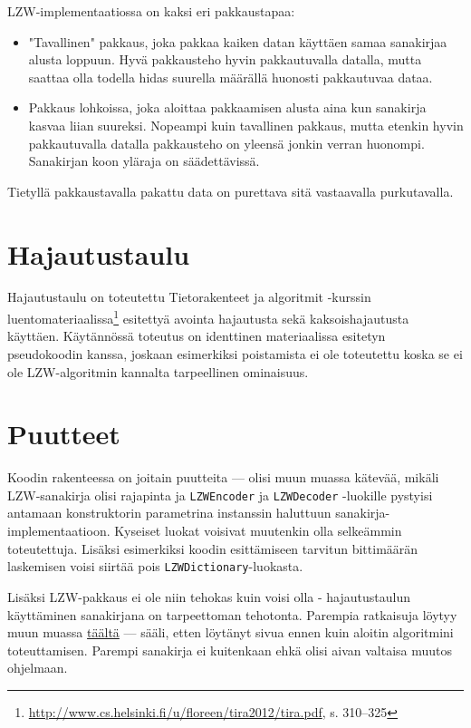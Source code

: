 \documentclass{article}
\begin{document}
LZW-implementaatiossa on kaksi eri pakkaustapaa:
\begin{itemize}
	\item "Tavallinen" pakkaus, joka pakkaa kaiken datan käyttäen samaa sanakirjaa alusta loppuun. Hyvä pakkausteho hyvin pakkautuvalla datalla, mutta saattaa olla todella hidas suurella määrällä huonosti pakkautuvaa dataa.
	\item Pakkaus lohkoissa, joka aloittaa pakkaamisen alusta aina kun sanakirja kasvaa liian suureksi. Nopeampi kuin tavallinen pakkaus, mutta etenkin hyvin pakkautuvalla datalla pakkausteho on yleensä jonkin verran huonompi. Sanakirjan koon yläraja on säädettävissä.
\end{itemize}
Tietyllä pakkaustavalla pakattu data on purettava sitä vastaavalla purkutavalla.

\section {Hajautustaulu}

Hajautustaulu on toteutettu Tietorakenteet ja algoritmit -kurssin luentomateriaalissa\footnote{\url{http://www.cs.helsinki.fi/u/floreen/tira2012/tira.pdf}, s. 310--325} esitettyä avointa hajautusta sekä kaksoishajautusta käyttäen. Käytännössä toteutus on identtinen materiaalissa esitetyn pseudokoodin kanssa, joskaan esimerkiksi poistamista ei ole toteutettu koska se ei ole LZW-algoritmin kannalta tarpeellinen ominaisuus.

\section {Puutteet}

Koodin rakenteessa on joitain puutteita --- olisi muun muassa kätevää, mikäli LZW-sanakirja olisi rajapinta ja \verb+LZWEncoder+ ja \verb+LZWDecoder+ -luokille pystyisi antamaan konstruktorin parametrina instanssin haluttuun sanakirja-\-implementaatioon. Kyseiset luokat voisivat muutenkin olla selkeämmin toteutettuja. Lisäksi esimerkiksi koodin esittämiseen tarvitun bittimäärän laskemisen voisi siirtää pois \verb+LZWDictionary+-luokasta.

Lisäksi LZW-pakkaus ei ole niin tehokas kuin voisi olla - hajautustaulun käyttäminen sanakirjana on tarpeettoman tehotonta. Parempia ratkaisuja löytyy muun muassa \href{http://warp.povusers.org/EfficientLZW/part4.html}{täältä} --- sääli, etten löytänyt sivua ennen kuin aloitin algoritmini toteuttamisen. Parempi sanakirja ei kuitenkaan ehkä olisi aivan valtaisa muutos ohjelmaan.
\end{document}
